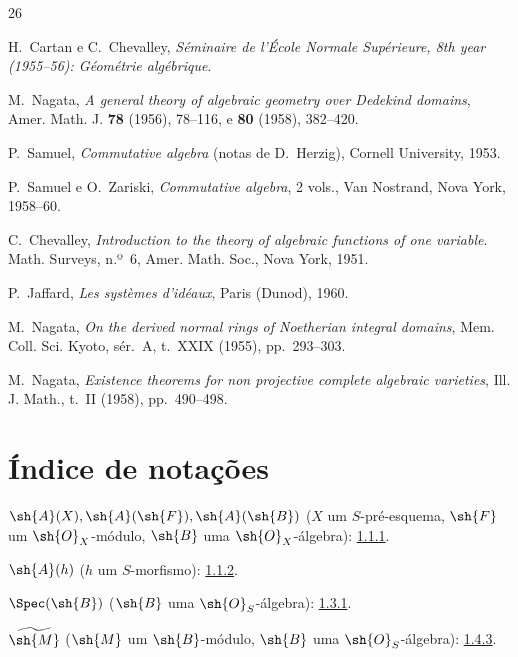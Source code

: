 \documentclass[oneside,10pt]{amsart}
\newcommand{\oldpage}[2][]{\marginnote{\normalfont\footnotesize\textbf{#1}~|~#2}\ignorespaces}
\begin{document}
\begin{thebibliography}{26}

H.~Cartan e C.~Chevalley,
\emph{Séminaire de l'École Normale Supérieure, 8th year (1955--56):
Géométrie algébrique}.

M.~Nagata,
\emph{A general theory of algebraic geometry over Dedekind domains},
Amer. Math. J. \textbf{78} (1956), 78--116, e \textbf{80} (1958),
382--420.

P.~Samuel,
\emph{Commutative algebra} (notas de D.~Herzig), Cornell University,
1953.

P.~Samuel e O.~Zariski,
\emph{Commutative algebra}, 2 vols., Van Nostrand, Nova York, 1958--60.

\oldpage[II]{205}
C.~Chevalley,
\emph{Introduction to the theory of algebraic functions of one variable}.
Math. Surveys, n.º~6, Amer. Math. Soc., Nova York, 1951.

P.~Jaffard,
\emph{Les systèmes d'idéaux}, Paris (Dunod), 1960.

M.~Nagata,
\emph{On the derived normal rings of Noetherian integral domains},
Mem. Coll. Sci. Kyoto, sér.~A, t.~XXIX (1955), pp.~293--303.

M.~Nagata,
\emph{Existence theorems for non projective complete algebraic varieties},
Ill. J. Math., t.~II (1958), pp.~490--498.

\end{thebibliography}
\clearpage
\oldpage[II]{206}
\clearpage
\oldpage[II]{207}
{}
\section*{Índice de notações}

\begingroup
\small
\setlength{\parindent}{0pt}
\setlength{\parskip}{2pt}

$\sh{A}(X),\sh{A}(\sh{F}),\sh{A}(\sh{B})$
($X$ um $S$-pré-esquema, $\sh{F}$ um $\sh{O}_X$-módulo,
$\sh{B}$ uma $\sh{O}_X$-álgebra): \hyperref[II.1.1.1]{1.1.1}.

$\sh{A}(h)$ ($h$ um $S$-morfismo): \hyperref[II.1.1.2]{1.1.2}.

$\Spec(\sh{B})$ ($\sh{B}$ uma $\sh{O}_S$-álgebra): \hyperref[II.1.3.1]{1.3.1}.

$\widetilde{\sh{M}}$ ($\sh{M}$ um $\sh{B}$-módulo,
$\sh{B}$ uma $\sh{O}_S$-álgebra): \hyperref[II.1.4.3]{1.4.3}.
\end{document}
